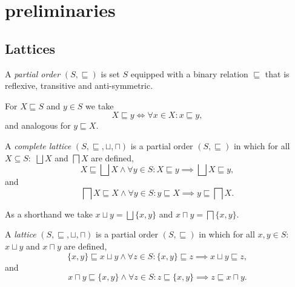 
\section{preliminaries}\label{sec:preliminaries}

\subsection{Lattices}\label{sec:lattices}

\begin{definition}
    A \textit{partial order} $(S, \sqsubseteq)$ is set $S$ equipped with a binary relation $\sqsubseteq$ that is reflexive, transitive and anti-symmetric.
\end{definition}

For $X \sqsubseteq S$ and $y \in S$ we take
\begin{equation*}
    X \sqsubseteq y \iff \forall x \in X : x \sqsubseteq y,
\end{equation*}
and analogous for $y \sqsubseteq X$.

\begin{definition}
    A \textit{complete lattice} $(S, \sqsubseteq, \sqcup, \sqcap)$ is a partial order $(S, \sqsubseteq)$ in which for all $X \subseteq S:$ $\bigsqcup X$ and $\bigsqcap X$ are defined,
        \begin{equation*}
            X \sqsubseteq \bigsqcup X \land \forall y \in S : X \sqsubseteq y \implies \bigsqcup X \sqsubseteq y,
        \end{equation*}
        and
        \begin{equation*}
            \bigsqcap X \sqsubseteq X \land \forall y \in S : y \sqsubseteq X \implies y \sqsubseteq \bigsqcap X.
        \end{equation*}
\end{definition}

As a shorthand we take $x \sqcup y = \bigsqcup \{x, y\}$ and $x \sqcap y = \bigsqcap \{x, y\}$.

\begin{definition}
    A \textit{lattice} $(S, \sqsubseteq, \sqcup, \sqcap)$ is a partial order $(S, \sqsubseteq)$ in which for all $x,y \in S:$ $x \sqcup y$ and $x \sqcap y$ are defined,
        \begin{equation*}
            \{x, y\} \sqsubseteq x \sqcup y \land \forall z \in S : \{x, y\} \sqsubseteq z \implies x \sqcup y \sqsubseteq z,
        \end{equation*}
        and
        \begin{equation*}
            x \sqcap y \sqsubseteq \{x, y\} \land \forall z \in S : z \sqsubseteq \{x, y\} \implies z \sqsubseteq x \sqcap y.
        \end{equation*}
\end{definition}

